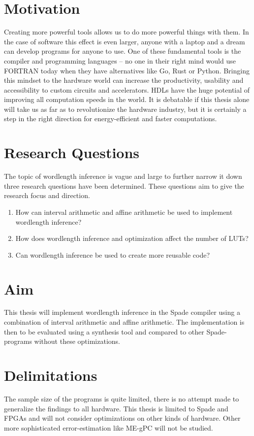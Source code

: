 \section{Motivation}
Creating more powerful tools allows us to do more powerful things with them. In the case of software this effect is even larger, anyone with a laptop and a dream can develop programs for anyone to use. One of these fundamental tools is the compiler and programming languages -- no one in their right mind would use FORTRAN today when they have alternatives like Go, Rust or Python. Bringing this mindset to the hardware world can increase the productivity, usability and accessibility to custom circuits and accelerators. HDLs have the huge potential of improving all computation speeds in the world. It is debatable if this thesis alone will take us as far as to revolutionize the hardware industry, but it is certainly a step in the right direction for energy-efficient and faster computations.

\section{Research Questions}
\label{secResearchQuestions}
The topic of wordlength inference is vague and large to further narrow it down three research questions have been determined. These questions aim to give the research focus and direction.

\begin{enumerate}
  \item How can interval arithmetic and affine arithmetic be used to implement wordlength inference?
  \item How does wordlength inference and optimization affect the number of LUTs?
  \item Can wordlength inference be used to create more reusable code?
\end{enumerate}

\section{Aim}
This thesis will implement wordlength inference in the Spade compiler using a combination of interval arithmetic and affine arithmetic. The implementation is then to be evaluated using a synthesis tool and compared to other Spade-programs without these optimizations.

\section{Delimitations}
The sample size of the programs is quite limited, there is no attempt made to generalize the findings to all hardware. This thesis is limited to Spade and FPGAs and will not consider optimizations on other kinds of hardware. Other more sophisticated error-estimation like ME-gPC \cite{src:MEgPC} will not be studied.
